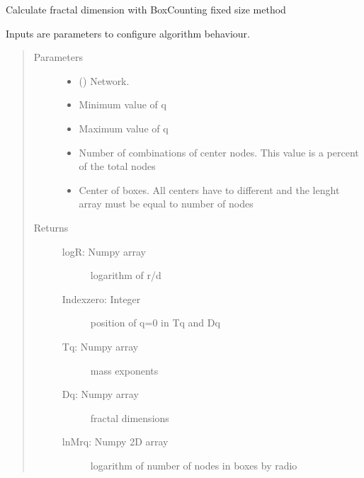 \documentclass[letterpaper,10pt,english]{sphinxmanual}
\begin{document}
\begin{fulllineitems}
\label{\detokenize{FSBCAlgorithm:FSBCAlgorithm.FSBCAlgorithm.FSBCAlgorithm}}
Calculate fractal dimension with BoxCounting fixed size method

Inputs are parameters to configure algorithm behaviour.
\begin{quote}\begin{description}
\item[{Parameters}] \leavevmode\begin{itemize}
\item {} 
 () \textendash{} Network.

\item {} 
 \textendash{} Minimum value of q

\item {} 
 \textendash{} Maximum value of q

\item {} 
 \textendash{} Number of combinations of center nodes. This value is a percent of the total nodes

\item {} 
 \textendash{} Center of boxes. All centers have to different and the lenght array must be equal to number of nodes

\end{itemize}

\item[{Returns}] \leavevmode
\begin{description}
\item[{logR: Numpy array}] \leavevmode
logarithm of r/d

\item[{Indexzero: Integer}] \leavevmode
position of q=0 in Tq and Dq

\item[{Tq: Numpy array}] \leavevmode
mass exponents

\item[{Dq: Numpy array}] \leavevmode
fractal dimensions

\item[{lnMrq: Numpy 2D array}] \leavevmode
logarithm of number of nodes in boxes by radio

\end{description}


\end{description}\end{quote}

\end{fulllineitems}
\end{document}
